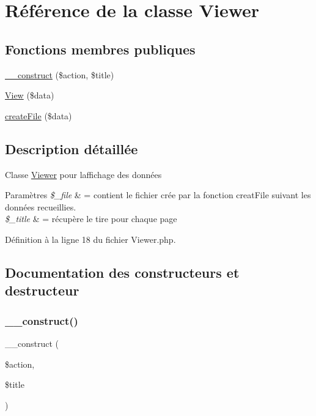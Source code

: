 \hypertarget{class_app_1_1_viewer}{}\section{Référence de la classe Viewer}
\label{class_app_1_1_viewer}
\subsection*{Fonctions membres publiques}
\begin{DoxyCompactItemize}
\item 
\hyperlink{class_app_1_1_viewer_a5dc57f09efa63fa174e82e8f34a79c3b}{\+\_\+\+\_\+construct} (\$action, \$title)
\item 
\hyperlink{class_app_1_1_viewer_ab1d271f3b152feb68aec05dd99ce8e66}{View} (\$data)
\item 
\hyperlink{class_app_1_1_viewer_a6826cb34504c5216f4352fec9f9f27d2}{create\+File} (\$data)
\end{DoxyCompactItemize}


\subsection{Description détaillée}
Classe \hyperlink{class_app_1_1_viewer}{Viewer} pour l\textquotesingle{}affichage des données 
\begin{DoxyParams}{Paramètres}
{\em \$\+\_\+file} & = contient le fichier crée par la fonction creat\+File suivant les données recueillies. \\
\hline
{\em \$\+\_\+title} & = récupère le tire pour chaque page \\
\hline
\end{DoxyParams}


Définition à la ligne 18 du fichier Viewer.\+php.



\subsection{Documentation des constructeurs et destructeur}
\mbox{\label{class_app_1_1_viewer_a5dc57f09efa63fa174e82e8f34a79c3b}} 
\subsubsection{\texorpdfstring{\+\_\+\+\_\+construct()}{\_\_construct()}}
{\footnotesize\ttfamily \+\_\+\+\_\+construct (\begin{DoxyParamCaption}\item[{}]{\$action,  }\item[{}]{\$title }\end{DoxyParamCaption})}

